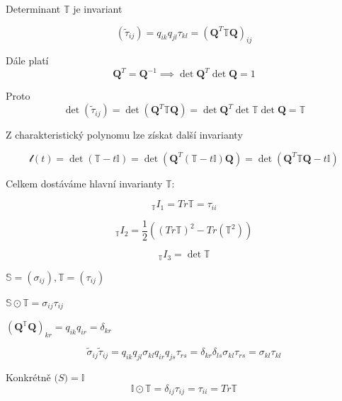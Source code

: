 \documentclass[../main.tex]{subfiles}
\begin{document}
\begin{example}
    Determinant $\mathbb{T}$ je invariant

    \begin{equation*}
        (\tilde{\tau}_{ij}) = q_{ik} q_{jl} \tau_{kl} = (\mathbf{Q}^T \mathbb{T} \mathbf{Q})_{ij}
    \end{equation*}

    Dále platí
    \begin{equation*}
        \mathbf{Q}^T = \mathbf{Q}^{-1} \implies \det \mathbf{Q}^T \det \mathbf{Q} = 1
    \end{equation*}

    Proto 
    \begin{equation*}
        \det(\tilde{\tau}_{ij}) = \det(\mathbf{Q}^T \mathbb{T} \mathbf{Q}) =\det \mathbf{Q}^T\det \mathbb{T} \det \mathbf{Q} = \mathbb{T} 
    \end{equation*}

    Z charakteristický polynomu lze získat další invarianty

    \begin{equation*}
    \mathcal{l}(t) = \det(\mathbb{T} - t \mathbb{I}) = \det (\mathbf{Q}^T (\mathbb{T} - t \mathbb{I}) \mathbf{Q}) = 
    \det (\mathbf{Q}^T \mathbb{T} \mathbf{Q}  - t \mathbb{I}) 
    \end{equation*}

    Celkem dostáváme hlavní invarianty $\mathbb{T}$:

    \begin{equation*}
        _\mathbb{T}I_1 = Tr \mathbb{T} = \tau_{ii}
    \end{equation*}

    \begin{equation*}
        _\mathbb{T}I_2 = \frac{1}{2}((Tr \mathbb{T})^2 - Tr (\mathbb{T}^2))
    \end{equation*}

    \begin{equation*}
        _\mathbb{T}I_3 = \det \mathbb{T}
    \end{equation*}


\end{example}

\begin{remark}
    $\mathbb{S} = (\sigma_{ij}), \mathbb{T} = (\tau_{ij})$

    $\mathbb{S} \odot \mathbb{T} = \sigma_{ij} \tau_{ij}$

    $(\mathbf{Q}^\mathbb{T} \mathbf{Q})_{kr} = q_{ik}q_{ir} = \delta_{kr}$

    \begin{equation*}
        \tilde{\sigma}_{ij} \tilde{\tau}_{ij} = q_{ik}q_{jl}\sigma_{kl} q_{ir}q_{js}\tau_{rs} = \delta_{kr} \delta_{ls}
        \sigma_{kl}\tau_{rs} = \sigma_{kl}\tau_{kl}
    \end{equation*}

    Konkrétně $\mathbb(S) = \mathbb{I}$
    \begin{equation*}
        \mathbb{I} \odot \mathbb{T} = \delta_{ij} \tau_{ij} = \tau_{ii} = Tr \mathbb{T}
    \end{equation*}
\end{remark}
\end{document}
